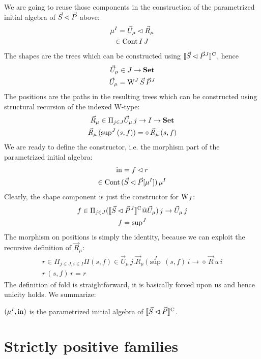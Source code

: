 \documentclass[10pt, conference, compsocconf]{IEEEtran}
\begin{document}
We are going to reuse those components in the construction of the
parametrized initial algebra of $\vec{S} \lhd \vec{P}$ above:
\begin{gather*}
  \mu^I = \vec{U}_\mu \lhd \vec{R}_\mu\\
  \in \mathrm{Cont}\,I\,J
\end{gather*}
The shapes are the trees which can be constructed using 
$\llbracket\vec{S} \lhd \vec{P}^J\rrbracket^{\mathrm C}$, hence
\begin{gather*}
  \vec{U}_\mu \in J \to \mathbf{Set}\\
  \vec{U}_\mu = \mathrm{W}^J\,\vec{S}\,\vec{P}^J
\end{gather*}
The positions are the paths in the resulting trees which can be constructed 
using structural recursion of the indexed W-type:
\begin{gather*}
  \vec{R}_\mu \in \Pi_{j\in J} \vec{U}_\mu\,j \to I \to \mathbf{Set}\\
  \vec{R}_\mu\,(\mathrm{sup}^J\,(s,f)) = \diamond\,\vec{R}_\mu\,(s,f) 
\end{gather*}
We are ready to define the constructor, i.e. the morphism part of the
parametrized initial algebra:
\begin{gather*}
  \mathrm{in} = f \lhd r \\
  \in \mathrm{Cont}\,(\vec{S} \lhd \vec{P}[\mu^I])
  \,\mu^I
\end{gather*}
Clearly, the shape component is just the constructor for $\mathrm{W}_J$:
\begin{gather*}
  f \in \Pi_{j\in J}(\llbracket\vec{S} \lhd \vec{P}^J\rrbracket^{\mathrm C}@ \vec{U}_\mu)\,j \to \vec{U}_\mu\,j\\
  f = \mathrm{sup}^J
\end{gather*}
The morphism on positions is simply the identity, because we can exploit the recursive definition of $\vec{R}_\mu$:
\begin{gather*}
  r \in \Pi_{j\in J,i\in I}\Pi (s,f) \in \vec{U}_\mu\,j.\vec{R}_\mu\,(\sup^J\,(s,f)\,i \to \diamond\,\vec{R}\,u\,i\\
  r\,(s,f)\,r = r
\end{gather*}
The definition of fold is straightforward, it is basically forced upon us and hence unicity holds. We summarize:
\begin{proposition}
  $(\mu^I,\mathrm{in})$ is the parametrized initial algebra of $\llbracket\vec{S} \lhd \vec{P}\rrbracket^{\mathrm C}$.
\end{proposition}

\section{Strictly positive families}
\label{sec:spf}
\end{document}
